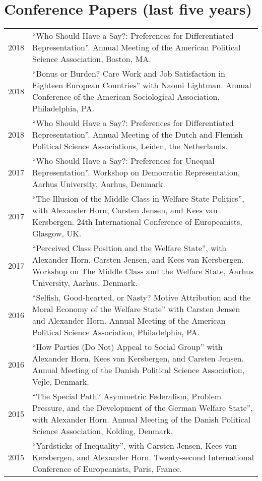 \documentclass[letterpaper,fontsize=10pt]{scrartcl}
\begin{document}
	\section{Conference Papers (last five years)}
	\vspace{-1.5em}
	\begin{tabularx}{\textwidth}{@{} l X @{} }
    2018 & ``Who Should Have a Say?: Preferences for Differentiated Representation''. Annual Meeting of the American Political Science Association, Boston, MA.\\[1ex]
    2018 & ``Bonus or Burden? Care Work and Job Satisfaction in Eighteen European Countries'' with Naomi Lightman. Annual Conference of the American Sociological Association, Philadelphia, PA.\\[1ex]
    2018 & ``Who Should Have a Say?: Preferences for Differentiated Representation''. Annual Meeting of the Dutch and Flemish Political Science Associations, Leiden, the Netherlands.\\[1ex]
		2017 & ``Who Should Have a Say?: Preferences for Unequal Representation''. Workshop on Democratic Representation, Aarhus University, Aarhus, Denmark.\\[1ex]
		2017 & ``The Illusion of the Middle Class in Welfare State Politics'', with Alexander Horn, Carsten Jensen, and Kees van Kersbergen. 24th International Conference of Europeanists, Glasgow, UK.\\[1ex]
		2017 & ``Perceived Class Position and the Welfare State'', with Alexander Horn, Carsten Jensen, and Kees van Kersbergen. Workshop on The Middle Class and the Welfare State, Aarhus University, Aarhus, Denmark.\\[1ex]
		2016 & ``Selfish, Good-hearted, or Nasty? Motive Attribution and the Moral Economy of the Welfare State'' with Carsten Jensen and Alexander Horn. Annual Meeting of the American Political Science Association, Philadelphia, PA.\\[1ex]
		2016 & ``How Parties (Do Not) Appeal to Social Group'' with Alexander Horn, Kees van Kersbergen, and Carsten Jensen. Annual Meeting of the Danish Political Science Association, Vejle, Denmark.\\[1ex]
		2015 & ``The Special Path? Asymmetric Federalism, Problem Pressure, and the Development of the German Welfare State'', with Alexander Horn. Annual Meeting of the Danish Political Science Association, Kolding, Denmark.\\[1ex]
		2015 & ``Yardsticks of Inequality'', with Carsten Jensen, Kees van Kersbergen, and Alexander Horn. Twenty-second International Conference of Europeanists, Paris, France.\\[1ex]

\end{tabularx}
\end{document}
